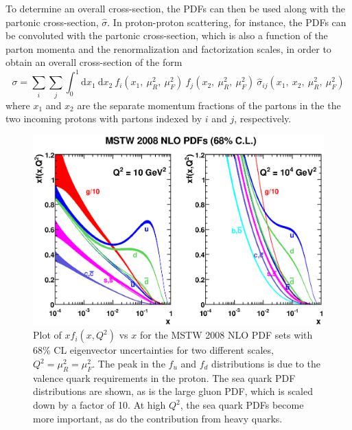 To determine an overall cross-section, 
the PDFs can then be used along with the partonic cross-section,
$\hat{\sigma}$.
In proton-proton scattering, for instance, 
the PDFs can be convoluted with the partonic
cross-section, which is also 
a function of the parton momenta and the renormalization and factorization
scales, in order to obtain an overall cross-section of the form
\begin{equation}
\sigma = \sum_i \sum_j \int^1_0 \textrm{d}x_1~\textrm{d}x_2~f_i(x_1,~\mu_R^2,~\mu_F^2)~f_j(x_2,~\mu_R^2,~\mu_F^2) ~\hat{\sigma}_{ij}(x_1,~x_2,~\mu_R^2,~\mu_F^2)
\label{eq:qcd_fac}
\end{equation}
where $x_1$ and $x_2$ are the separate momentum fractions of the partons in the 
the two incoming protons with partons indexed by $i$ and $j$, respectively.


\begin{figure}[ht]
\centering
\includegraphics[width=.9\textwidth]{figures/theory/mstw.eps}
\caption{Plot of $xf_i(x,Q^2)$ vs $x$ for the MSTW 2008 NLO PDF sets \cite{Martin:2009iq} with 68\% CL 
eigenvector uncertainties for two different scales, $Q^2=\mu_R^2=\mu_F^2$.
The peak in the $f_u$ and $f_d$ distributions is due to the valence
quark requirements in the proton. The sea quark PDF distributions are shown,
as is the large gluon PDF, which is scaled down by a factor of 10.  At
high $Q^2$, the sea quark PDFs become more important, as do the 
contribution from heavy quarks.}
\label{fig:pdf_mstw}
\end{figure}


